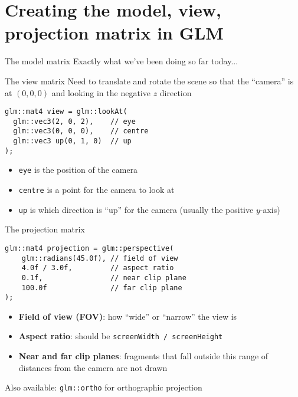 \part{Creating the model, view, projection matrix in GLM}
\frame{\partpage}

\begin{frame}{The model matrix}
	\pause Exactly what we've been doing so far today...
\end{frame}

\begin{frame}[fragile]{The view matrix}
	\pause Need to translate and rotate the scene so that the ``camera'' is at $(0,0,0)$ and looking in the negative $z$ direction
	\pause\begin{lstlisting}
glm::mat4 view = glm::lookAt(
  glm::vec3(2, 0, 2),    // eye
  glm::vec3(0, 0, 0),    // centre
  glm::vec3 up(0, 1, 0)  // up
);
	\end{lstlisting}
	\begin{itemize}
		\pause\item \lstinline{eye} is the position of the camera
		\pause\item \lstinline{centre} is a point for the camera to look at
		\pause\item \lstinline{up} is which direction is ``up'' for the camera (usually the positive $y$-axis)
	\end{itemize}
\end{frame}

\begin{frame}[fragile]{The projection matrix}
	\pause\begin{lstlisting}
glm::mat4 projection = glm::perspective(
	glm::radians(45.0f), // field of view
	4.0f / 3.0f,         // aspect ratio
	0.1f,                // near clip plane
	100.0f               // far clip plane
);
	\end{lstlisting}
	\begin{itemize}
		\pause\item \textbf{Field of view (FOV)}: how ``wide'' or ``narrow'' the view is
		\pause\item \textbf{Aspect ratio}: should be \lstinline{screenWidth / screenHeight}
		\pause\item \textbf{Near and far clip planes}: fragments that fall outside this range of distances from the camera are not drawn
	\end{itemize}
	\pause Also available: \lstinline{glm::ortho} for orthographic projection
\end{frame}